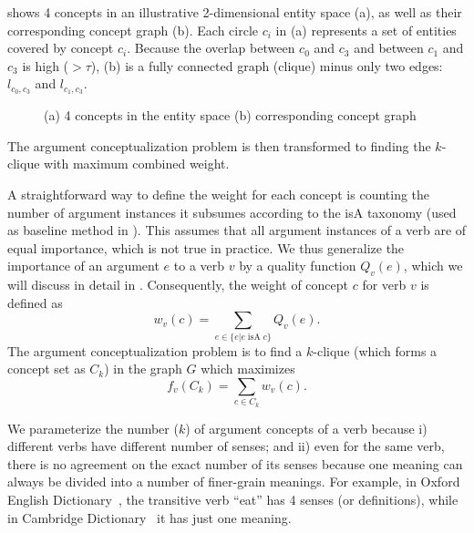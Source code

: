  shows 4 concepts in an illustrative 2-dimensional
entity space (a), as well as their corresponding concept graph (b).
Each circle $c_i$ in (a) represents a set of entities covered by concept $c_i$.
Because the overlap between $c_0$ and $c_3$ and between $c_1$ and $c_3$ 
is high  ($>\tau$), (b) is a fully connected graph (clique) minus only
two edges: $l_{c_0,c_3}$ and $l_{c_1, c_3}$.

\begin{figure}[th]
\centering
{}
\caption{(a) 4 concepts in the entity space
(b) corresponding concept graph
}
\label{fig:graph_model}
\end{figure}

The argument conceptualization problem is then transformed to
finding the $k$-clique with maximum combined weight.

A straightforward way to define the weight for each concept is
counting the number of argument instances it subsumes according to the
isA taxonomy (used as baseline method in ).
This assumes that all argument instances of a verb are of
equal importance, which is not true in practice.
We thus generalize the importance of an argument $e$ to a verb $v$
by a quality function $Q_v(e)$, which we will discuss in detail
in .
Consequently, the weight of concept $c$ for verb $v$ is
defined as
\begin{equation}
w_v(c)=\sum_{e\in \{e|e\;\text{isA}\;c\}}{Q_v(e)}.
\end{equation}
The argument conceptualization problem is to find
a $k$-clique (which forms a concept set as $C_k$)
in the graph $G$ which maximizes
\begin{equation}
\label{eq:f}
f_v(C_k)=\sum_{c\in C_k}{w_v(c)}.
\end{equation}

We parameterize the number ($k$) of argument concepts of a
verb because i) different verbs have different number of senses; and ii)
even for the same verb, there is no agreement on the exact number of its
senses because one meaning can always be divided into a number of
finer-grain meanings.
For example, in Oxford English Dictionary~\cite{oxford},
the transitive verb ``eat'' has 4 senses (or definitions),
while in Cambridge Dictionary~\cite{cambridge} it has just one meaning.
